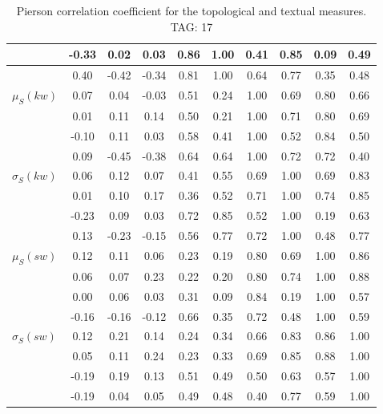 \begin{table*}[h!]
\begin{center}
\begin{tabular}{| l | c | c | c | c | c | c | c | c | c |}
 & -0.33  & 0.02  & 0.03  & 0.86  & 1.00  & 0.41  & 0.85  & 0.09  & 0.49 \\\hline
 & 0.40  & -0.42  & -0.34  & 0.81  & 1.00  & 0.64  & 0.77  & 0.35  & 0.48 \\\hline
$\mu_S(kw)$ & 0.07  & 0.04  & -0.03  & 0.51  & 0.24  & 1.00  & 0.69  & 0.80  & 0.66 \\\hline
 & 0.01  & 0.11  & 0.14  & 0.50  & 0.21  & 1.00  & 0.71  & 0.80  & 0.69 \\\hline
 & -0.10  & 0.11  & 0.03  & 0.58  & 0.41  & 1.00  & 0.52  & 0.84  & 0.50 \\\hline
 & 0.09  & -0.45  & -0.38  & 0.64  & 0.64  & 1.00  & 0.72  & 0.72  & 0.40 \\\hline
$\sigma_S(kw)$ & 0.06  & 0.12  & 0.07  & 0.41  & 0.55  & 0.69  & 1.00  & 0.69  & 0.83 \\\hline
 & 0.01  & 0.10  & 0.17  & 0.36  & 0.52  & 0.71  & 1.00  & 0.74  & 0.85 \\\hline
 & -0.23  & 0.09  & 0.03  & 0.72  & 0.85  & 0.52  & 1.00  & 0.19  & 0.63 \\\hline
 & 0.13  & -0.23  & -0.15  & 0.56  & 0.77  & 0.72  & 1.00  & 0.48  & 0.77 \\\hline
$\mu_S(sw)$ & 0.12  & 0.11  & 0.06  & 0.23  & 0.19  & 0.80  & 0.69  & 1.00  & 0.86 \\\hline
 & 0.06  & 0.07  & 0.23  & 0.22  & 0.20  & 0.80  & 0.74  & 1.00  & 0.88 \\\hline
 & 0.00  & 0.06  & 0.03  & 0.31  & 0.09  & 0.84  & 0.19  & 1.00  & 0.57 \\\hline
 & -0.16  & -0.16  & -0.12  & 0.66  & 0.35  & 0.72  & 0.48  & 1.00  & 0.59 \\\hline
$\sigma_S(sw)$ & 0.12  & 0.21  & 0.14  & 0.24  & 0.34  & 0.66  & 0.83  & 0.86  & 1.00 \\\hline
 & 0.05  & 0.11  & 0.24  & 0.23  & 0.33  & 0.69  & 0.85  & 0.88  & 1.00 \\\hline
 & -0.19  & 0.19  & 0.13  & 0.51  & 0.49  & 0.50  & 0.63  & 0.57  & 1.00 \\\hline
 & -0.19  & 0.04  & 0.05  & 0.49  & 0.48  & 0.40  & 0.77  & 0.59  & 1.00 \\\hline
\end{tabular}
\caption{Pierson correlation coefficient for the topological and textual measures. TAG: 17}
\end{center}
\end{table*}
